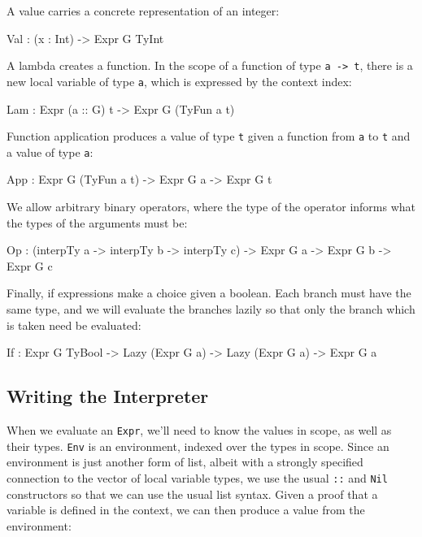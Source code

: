 \noindent
A value carries a concrete representation of an integer:

\begin{code}
Val : (x : Int) -> Expr G TyInt
\end{code}

\noindent
A lambda creates a function.
In the scope of a function of type \texttt{a -> t}, there is a new local variable of type \texttt{a}, which is expressed by the context index:

\begin{code}
Lam : Expr (a :: G) t -> Expr G (TyFun a t)
\end{code}

\noindent
Function application produces a value of type \texttt{t} given a function from  \texttt{a} to \texttt{t} and a value of type \texttt{a}:

\begin{code}
App : Expr G (TyFun a t) -> Expr G a -> Expr G t
\end{code}

\noindent
We allow arbitrary binary operators, where the type of the operator informs what the types of the arguments must be:

\begin{code}
Op : (interpTy a -> interpTy b -> interpTy c) ->
     Expr G a -> Expr G b -> Expr G c
\end{code}

\noindent
Finally, if expressions make a choice given a boolean.
Each branch must have the same type, and we will evaluate the branches
lazily so that only the branch which is taken need be evaluated:

\begin{code}
If : Expr G TyBool ->
     Lazy (Expr G a) ->
     Lazy (Expr G a) ->
     Expr G a
\end{code}

\subsection{Writing the Interpreter}
\label{sec:interp:eval}

When we evaluate an \texttt{Expr}, we'll need to know the values in scope, as well as their types.
\texttt{Env} is an environment, indexed over the types in scope.
Since an environment is just another form of list, albeit with a strongly specified connection to the vector of local variable types, we use the usual \texttt{::} and \texttt{Nil} constructors so that we can use the usual list syntax.
Given a proof that a variable is defined in the context, we can then produce a value from the environment:

